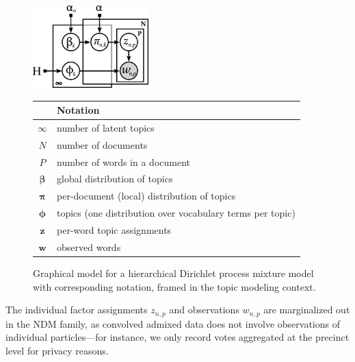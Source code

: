 \documentclass[twoside,11pt]{article}
\begin{document}
\begin{figure}[tb]
    \begin{minipage}[c]{0.40\linewidth}
        \centering
        \includegraphics[height=120px]{graphicalmodel_HDP.pdf}
    \end{minipage}
    \hspace{0.5cm}
    \begin{minipage}[t]{0.50\linewidth}
        \footnotesize
        \begin{tabular}{cl}
        \toprule
        & \textbf{Notation} \\
        \midrule
         $\infty$ & number of latent topics \\
         $N$ & number of documents \\
         $P$ & number of words in a document \\
         $\boldsymbol{\beta}$ & global distribution of topics  \\
         $\boldsymbol{\pi}$ & per-document (local) distribution of topics \\
         $\boldsymbol{\phi}$ & topics (one distribution over vocabulary terms per topic) \\
         $\boldsymbol{z}$ & per-word topic assignments \\
         $\boldsymbol{w}$ & observed words \\
         \bottomrule
        \end{tabular}
    \end{minipage}
    \caption{Graphical model for a hierarchical Dirichlet process mixture model~\citep{Teh:2006} with corresponding notation, framed in the topic modeling context.}
    \label{fig:hdp}
\end{figure}

The individual factor assignments $z_{n,p}$ and observations $w_{n,p}$ are marginalized out in the NDM family, as convolved admixed data does not involve observations of individual particles---for instance, we only record votes aggregated at the precinct level for privacy reasons.
\end{document}
